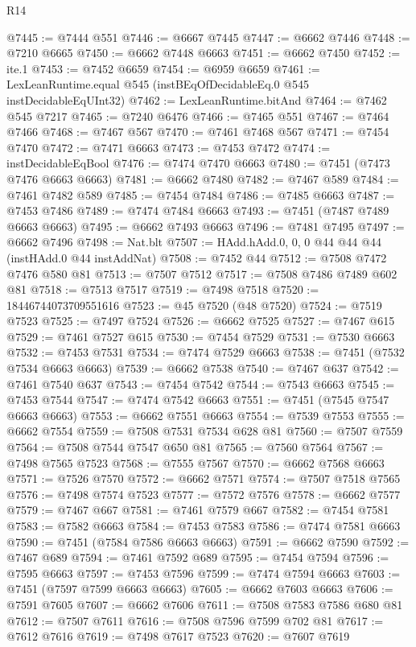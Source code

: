 \begin{lexlean}{R14}
\begin{coremodule}
{{{{{{{{{{{{{{{{{{{{{{{{{{{{{{{{{{{{{{{{{{{{{{{{{{{{{{{{{{{{{{{{{{{{{{{{{{{{{{{{{{@7445 := @7444 @551
@7446 := @6667 @7445
@7447 := @6662 @7446
@7448 := @7210 @6665
@7450 := @6662 @7448 @6663
@7451 := @6662 @7450
@7452 := ite.{1}
@7453 := @7452 @6659
@7454 := @6959 @6659
@7461 := LexLeanRuntime.equal @545 (instBEqOfDecidableEq.{0} @545 instDecidableEqUInt32)
@7462 := LexLeanRuntime.bitAnd
@7464 := @7462 @545 @7217
@7465 := @7240 @6476
@7466 := @7465 @551
@7467 := @7464 @7466
@7468 := @7467 @567
@7470 := @7461 @7468 @567
@7471 := @7454 @7470
@7472 := @7471 @6663
@7473 := @7453 @7472
@7474 := instDecidableEqBool
@7476 := @7474 @7470 @6663
@7480 := @7451 (@7473 @7476 @6663 @6663)
@7481 := @6662 @7480
@7482 := @7467 @589
@7484 := @7461 @7482 @589
@7485 := @7454 @7484
@7486 := @7485 @6663
@7487 := @7453 @7486
@7489 := @7474 @7484 @6663
@7493 := @7451 (@7487 @7489 @6663 @6663)
@7495 := @6662 @7493 @6663
@7496 := @7481 @7495
@7497 := @6662 @7496
@7498 := Nat.blt
@7507 := HAdd.hAdd.{0, 0, 0} @44 @44 @44 (instHAdd.{0} @44 instAddNat)
@7508 := @7452 @44
@7512 := @7508 @7472 @7476 @580 @81
@7513 := @7507 @7512
@7517 := @7508 @7486 @7489 @602 @81
@7518 := @7513 @7517
@7519 := @7498 @7518
@7520 := 18446744073709551616
@7523 := @45 @7520 (@48 @7520)
@7524 := @7519 @7523
@7525 := @7497 @7524
@7526 := @6662 @7525
@7527 := @7467 @615
@7529 := @7461 @7527 @615
@7530 := @7454 @7529
@7531 := @7530 @6663
@7532 := @7453 @7531
@7534 := @7474 @7529 @6663
@7538 := @7451 (@7532 @7534 @6663 @6663)
@7539 := @6662 @7538
@7540 := @7467 @637
@7542 := @7461 @7540 @637
@7543 := @7454 @7542
@7544 := @7543 @6663
@7545 := @7453 @7544
@7547 := @7474 @7542 @6663
@7551 := @7451 (@7545 @7547 @6663 @6663)
@7553 := @6662 @7551 @6663
@7554 := @7539 @7553
@7555 := @6662 @7554
@7559 := @7508 @7531 @7534 @628 @81
@7560 := @7507 @7559
@7564 := @7508 @7544 @7547 @650 @81
@7565 := @7560 @7564
@7567 := @7498 @7565 @7523
@7568 := @7555 @7567
@7570 := @6662 @7568 @6663
@7571 := @7526 @7570
@7572 := @6662 @7571
@7574 := @7507 @7518 @7565
@7576 := @7498 @7574 @7523
@7577 := @7572 @7576
@7578 := @6662 @7577
@7579 := @7467 @667
@7581 := @7461 @7579 @667
@7582 := @7454 @7581
@7583 := @7582 @6663
@7584 := @7453 @7583
@7586 := @7474 @7581 @6663
@7590 := @7451 (@7584 @7586 @6663 @6663)
@7591 := @6662 @7590
@7592 := @7467 @689
@7594 := @7461 @7592 @689
@7595 := @7454 @7594
@7596 := @7595 @6663
@7597 := @7453 @7596
@7599 := @7474 @7594 @6663
@7603 := @7451 (@7597 @7599 @6663 @6663)
@7605 := @6662 @7603 @6663
@7606 := @7591 @7605
@7607 := @6662 @7606
@7611 := @7508 @7583 @7586 @680 @81
@7612 := @7507 @7611
@7616 := @7508 @7596 @7599 @702 @81
@7617 := @7612 @7616
@7619 := @7498 @7617 @7523
@7620 := @7607 @7619
}}}}}}}}}}}}}}}}}}}}}}}}}}}}}}}}}}}}}}}}}}}}}}}}}}}}}}}}}}}}}}}}}}}}}}}}}}}}}}}}}}
\end{coremodule}
\end{lexlean}
